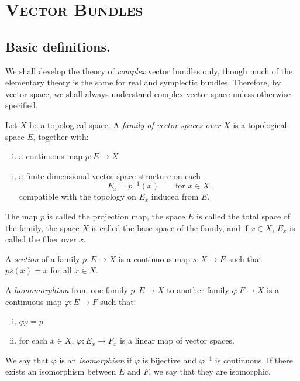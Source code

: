 \chapter{\scshape Vector Bundles}

\section{Basic definitions.}\label{sec:1.1} We shall develop the theory of \textit{complex} vector bundles only, though much of the elementary theory is the same for real and symplectic bundles. Therefore, by vector space, we shall always understand complex vector space unless otherwise specified. \par

Let $X$ be a topological space. A \textit{family of vector spaces over} $X$ is a topological space $E$, together with:
\begin{enumerate}[(i)]
    \item a continuous map $p: E \to X$
    \item a finite dimensional vector space structure on each
    \begin{equation*}
        E_x = p^{-1}(x) \qquad \text{for } x \in X \text{,}
    \end{equation*}
    compatible with the topology on $E_x$ induced from $E$.
\end{enumerate}

The map $p$ is called the projection map, the space $E$ is called the total space of the family, the space $X$ is called the base space of the family, and if $x \in X$, $E_x$ is called the fiber over $x$. \par

A \textit{section} of a family $p: E \to X$ is a continuous map $s: X \to E$ such that $ps(x) = x$ for all $x \in X$. \par

\pagebreak
A \textit{homomorphism} from one family $p: E \to X$ to another family $q: F \to X$ is a continuous map $\varphi: E \to F$ such that:
\begin{enumerate}[(i)]
    \item $q\varphi = p$
    \item for each $x \in X$, $\varphi: E_x \to F_x$ is a linear map of vector spaces.
\end{enumerate}

We say that $\varphi$ is an \textit{isomorphism} if $\varphi$ is bijective and $\varphi^{-1}$ is continuous. If there exists an isomorphism between $E$ and $F$, we say that they are isomorphic. \par

